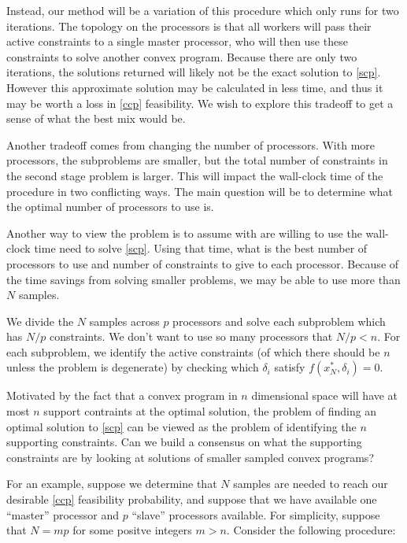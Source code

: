 \documentclass[12pt]{article}
\begin{document}
Instead, our method will be a variation of this procedure which only runs for two iterations.
The topology on the processors is that all workers will pass their active constraints to a single master processor, who will then use these constraints to solve another convex program.
Because there are only two iterations, the solutions returned will likely not be the exact solution to \ref{scp}.
However this approximate solution may be calculated in less time, and thus it may be worth a loss in \ref{ccp} feasibility.
We wish to explore this tradeoff to get a sense of what the best mix would be.

Another tradeoff comes from changing the number of processors.
With more processors, the subproblems are smaller, but the total number of constraints in the second stage problem is larger.
This will impact the wall-clock time of the procedure in two conflicting ways.
The main question will be to determine what the optimal number of processors to use is.

Another way to view the problem is to assume with are willing to use the wall-clock time need to solve \ref{scp}.
Using that time, what is the best number of processors to use and number of constraints to give to each processor. Because of the time savings from solving smaller problems, we may be able to use more than $N$ samples.

We divide the $N$ samples across $p$ processors and solve each subproblem which has $N/p$ constraints.
We don't want to use so many processors that $N/p < n$.
For each subproblem, we identify the active constraints (of which there should be $n$ unless the problem is degenerate) by checking which $\delta_i$ satisfy $f(x_N^*, \delta_i) = 0$.

Motivated by the fact that a convex program in $n$ dimensional space will have at most $n$
support contraints at the optimal solution, the problem of finding an optimal solution to \ref{scp} can be viewed as the problem of identifying the $n$ supporting constraints.
Can we build a consensus on what the supporting constraints are by looking at solutions of 
smaller sampled convex programs? 

For an example, suppose we determine that $N$ samples are needed to reach our desirable \ref{ccp} feasibility probability, and suppose that we have available one ``master'' processor
and $p$ ``slave'' processors available.
For simplicity, suppose that $N = mp$ for some positve integers $m > n$.
Consider the following procedure:
\end{document}
